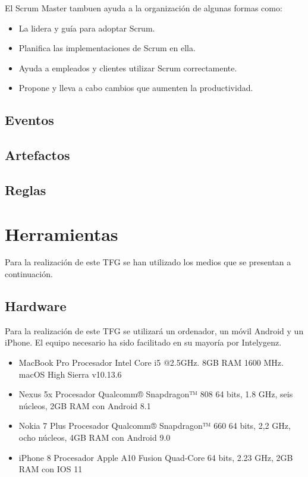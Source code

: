 El Scrum Master tambuen ayuda a la organización de algunas formas como:
\begin{itemize}
	\item La lidera y guía para adoptar Scrum.
	\item Planifica las implementaciones de Scrum en ella.
	\item Ayuda a empleados y clientes utilizar Scrum correctamente.
	\item Propone y lleva a cabo cambios que aumenten la productividad.
\end{itemize}

\subsection{Eventos}



\subsection{Artefactos}

\subsection{Reglas}


\section{Herramientas}

Para la realización de este \acs{TFG} se han utilizado los medios que se presentan a continuación.

\subsection{Hardware}

Para la realización de este TFG se utilizará un ordenador, un móvil Android y un iPhone. El equipo 
necesario ha sido facilitado en su mayoría por Intelygenz.

\begin{itemize}
	\item MacBook Pro Procesador Intel Core i5 @2.5GHz. 8GB RAM 1600 MHz. macOS High Sierra v10.13.6
	\item Nexus 5x Procesador Qualcomm® Snapdragon™ 808 64 bits, 1.8 GHz, seis núcleos, 2GB RAM con Android 8.1
	\item Nokia 7 Plus Procesador Qualcomm® Snapdragon™ 660 64 bits, 2,2 GHz, ocho núcleos, 4GB RAM con Android 9.0
	\item iPhone 8 Procesador Apple A10 Fusion Quad-Core 64 bits, 2.23 GHz, 2GB RAM con IOS 11
\end{itemize}

